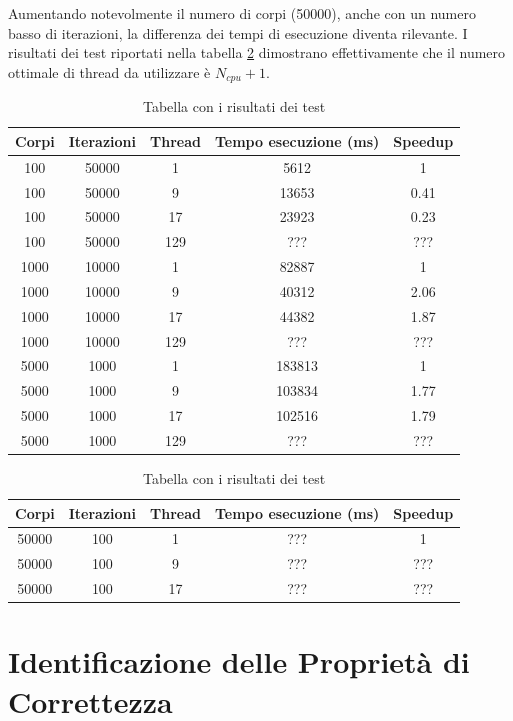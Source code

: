 \documentclass[12pt,a4paper,openright,twoside]{book}
\begin{document}
Aumentando notevolmente il numero di corpi (50000), anche con un numero basso di iterazioni,
la differenza dei tempi di esecuzione diventa rilevante.
I risultati dei test riportati nella tabella \ref{tab:table2} dimostrano effettivamente che
il numero ottimale di thread da utilizzare è $N_{cpu} + 1$.

\begin{center}
	\begin{table}
		\begin{tabular}{ |c|c|c|c|c| } 
			\hline
				Corpi & Iterazioni & Thread & Tempo esecuzione (ms) & Speedup \\
			\hline
				100  & 50000  & 1 & 5612 & 1 \\
			\hline
				100  & 50000  & 9 & 13653 & 0.41 \\
			\hline
				100  & 50000  & 17 & 23923 & 0.23 \\
			\hline
				100  & 50000  & 129 & ??? & ??? \\
			\hline
				1000  & 10000  & 1 & 82887 & 1 \\
			\hline
				1000  & 10000  & 9 & 40312 & 2.06 \\
			\hline
				1000  & 10000  & 17 & 44382 & 1.87 \\
			\hline
				1000  & 10000  & 129 & ??? & ??? \\
			\hline
				5000  & 1000  & 1 & 183813 & 1 \\
			\hline
				5000  & 1000  & 9 & 103834 & 1.77 \\
			\hline
				5000  & 1000  & 17 & 102516 & 1.79 \\
			\hline
				5000  & 1000  & 129 & ??? & ??? \\
			\hline
		\end{tabular}
		\label{tab:table1}
		\caption{Tabella con i risultati dei test}
	\end{table}
\end{center}

\begin{center}
	\begin{table}
		\begin{tabular}{ |c|c|c|c|c| } 
			\hline
				Corpi & Iterazioni & Thread & Tempo esecuzione (ms) & Speedup \\
			\hline
				50000  & 100  & 1 & ??? & 1 \\
			\hline
				50000  & 100  & 9 & ??? & ??? \\
			\hline
				50000  & 100  & 17 & ??? & ??? \\
			\hline
		\end{tabular}
		\label{tab:table2}
		\caption{Tabella con i risultati dei test}
	\end{table}
\end{center}

\chapter{Identificazione delle Proprietà di Correttezza} %
\label{chap:Identificazione delle Proprietà di Correttezza}
\end{document}
